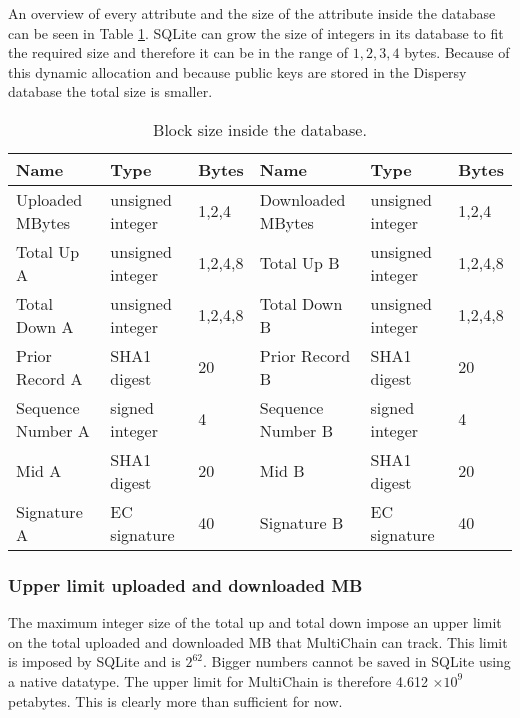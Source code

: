 An overview of every attribute and the size of the attribute inside the database can be seen in Table \ref{table:block_size_persistence}.
SQLite can grow the size of integers in its database to fit the required size
and therefore it can be in the range of $1,2,3,4$ bytes.
Because of this dynamic allocation and because public keys are stored in the Dispersy database
the total size is smaller.

\begin{table}[]
\begin{adjustwidth}{-.5in}{-.5in}
\begin{center}
\begin{tabular}{lll||lll}
Name              & Type             & Bytes                  & Name              & Type             & Bytes    \\ \hline
Uploaded MBytes   & unsigned integer & 1,2,4                  & Downloaded MBytes & unsigned integer & 1,2,4    \\
Total Up A        & unsigned integer & 1,2,4,8                & Total Up B        & unsigned integer & 1,2,4,8  \\
Total Down A      & unsigned integer & 1,2,4,8                & Total Down B      & unsigned integer & 1,2,4,8  \\
Prior Record A    & SHA1 digest      & 20                     & Prior Record B    & SHA1 digest      & 20       \\
Sequence Number A & signed integer   & 4                      & Sequence Number B & signed integer   & 4        \\
Mid A             & SHA1 digest      & 20                     & Mid B             & SHA1 digest      & 20       \\
Signature A       & EC signature     & 40                     & Signature B       & EC signature     & 40
\end{tabular}
\caption{Block size inside the database.}
\label{table:block_size_persistence}
\end{center}
\end{adjustwidth}
\end{table}

\subsubsection{Upper limit uploaded and downloaded MB}
The maximum integer size of the total up and total down impose an upper limit
on the total uploaded and downloaded MB that MultiChain can track.
This limit is imposed by SQLite and is $2^{62}$.
Bigger numbers cannot be saved in SQLite using a native datatype.
The upper limit for MultiChain is therefore 4.612 \ensuremath{\times 10^{9}} petabytes.
This is clearly more than sufficient for now.
